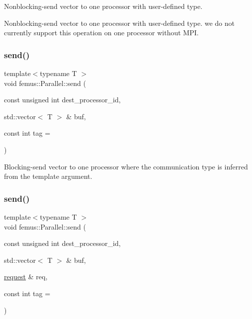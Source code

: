 Nonblocking-\/send vector to one processor with user-\/defined type.

Nonblocking-\/send vector to one processor with user-\/defined type. we do not currently support this operation on one processor without M\+PI. \mbox{\label{namespacefemus_1_1_parallel_a5f272a5537ade03af5151accf483464c}} 
\subsubsection{\texorpdfstring{send()}{send()}\hspace{0.1cm}{\footnotesize\ttfamily [3/4]}}
{\footnotesize\ttfamily template$<$typename T $>$ \\
void femus\+::\+Parallel\+::send (\begin{DoxyParamCaption}\item[{const unsigned int}]{dest\+\_\+processor\+\_\+id,  }\item[{std\+::vector$<$ T $>$ \&}]{buf,  }\item[{const int}]{tag = {} }\end{DoxyParamCaption})\hspace{0.3cm}{\ttfamily [inline]}}

Blocking-\/send vector to one processor where the communication type is inferred from the template argument. \mbox{\label{namespacefemus_1_1_parallel_ad9fff04a83c0fb27ed2f48ba4bd75245}} 
\subsubsection{\texorpdfstring{send()}{send()}\hspace{0.1cm}{\footnotesize\ttfamily [4/4]}}
{\footnotesize\ttfamily template$<$typename T $>$ \\
void femus\+::\+Parallel\+::send (\begin{DoxyParamCaption}\item[{const unsigned int}]{dest\+\_\+processor\+\_\+id,  }\item[{std\+::vector$<$ T $>$ \&}]{buf,  }\item[{\mbox{\hyperlink{structfemus_1_1_parallel_1_1request}{request}} \&}]{req,  }\item[{const int}]{tag = {} }\end{DoxyParamCaption})\hspace{0.3cm}{\ttfamily [inline]}}

